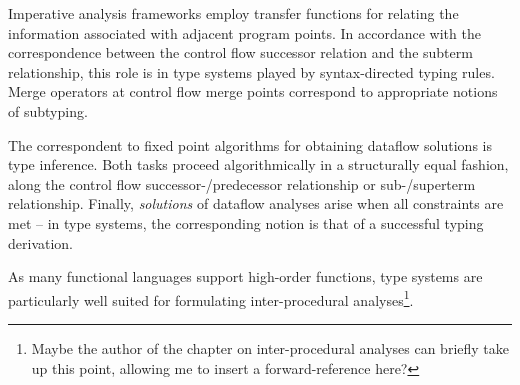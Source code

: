 Imperative analysis frameworks employ transfer functions for relating
the information associated with adjacent program points. In accordance
with the correspondence between the control flow successor relation and
the subterm relationship, this role is in type systems played by
syntax-directed typing rules. Merge operators at control flow merge
points correspond to appropriate notions of subtyping.

The correspondent to fixed point algorithms for obtaining dataflow
solutions is type inference. Both tasks proceed algorithmically in a
structurally equal fashion, along the control flow
successor-/predecessor relationship or sub-/superterm relationship.
Finally, \emph{solutions} of dataflow analyses arise when
all constraints are met -- in type systems, the corresponding notion is
that of a successful typing derivation.

As many functional languages support high-order functions, type
systems are particularly well suited for formulating inter-procedural
analyses\footnote{Maybe the author of the chapter on inter-procedural
analyses can briefly take up this point, allowing me to insert a
forward-reference here?}.

